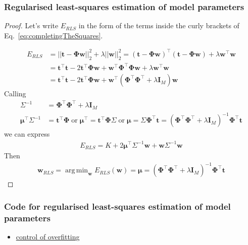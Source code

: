\documentclass[11pt]{beamer}
\DeclareMathOperator*{\argmin}{arg\,min}
\begin{document}
\begin{frame}
    \frametitle{Regularised least-squares estimation of model parameters}
	\tiny
		\begin{proof}
			Let's write $E_{RLS}$ in the form of the terms inside the curly brackets of Eq.~\ref{eq:completingTheSquares}.

		\begin{align*}
			E_{RLS}&=||\mathbf{t}-\boldsymbol{\Phi}\mathbf{w}||_2^2+\lambda||\mathbf{w}||_2^2=(\mathbf{t}-\boldsymbol{\Phi}\mathbf{w})^\intercal(\mathbf{t}-\boldsymbol{\Phi}\mathbf{w})+\lambda\mathbf{w}^\intercal\mathbf{w}\\
                   &=\mathbf{t}^\intercal\mathbf{t}-2\mathbf{t}^\intercal\boldsymbol{\Phi}\mathbf{w}+\mathbf{w}^\intercal\boldsymbol{\Phi}^\intercal\boldsymbol{\Phi}\mathbf{w}+\lambda\mathbf{w}^\intercal\mathbf{w}\\
                   &=\mathbf{t}^\intercal\mathbf{t}-2\mathbf{t}^\intercal\boldsymbol{\Phi}\mathbf{w}+\mathbf{w}^\intercal(\boldsymbol{\Phi}^\intercal\boldsymbol{\Phi}^\intercal+\lambda\mathbf{I}_M)\mathbf{w}
		\end{align*}
		Calling
		\begin{align*}
			\Sigma^{-1}&=\boldsymbol{\Phi}^\intercal\boldsymbol{\Phi}^\intercal+\lambda\mathbf{I}_M\\
			\boldsymbol{\mu}^\intercal\Sigma^{-1}&=\mathbf{t}^\intercal\boldsymbol{\Phi}\;\text{or}\;\boldsymbol{\mu}^\intercal=\mathbf{t}^\intercal\boldsymbol{\Phi}\Sigma\;\text{or}\;\boldsymbol{\mu}=\Sigma\boldsymbol{\Phi}^\intercal\mathbf{t}=\left(\boldsymbol{\Phi}^\intercal\boldsymbol{\Phi}^\intercal+\lambda\mathbf{I}_M\right)^{-1}\boldsymbol{\Phi}^\intercal\mathbf{t}
		\end{align*}
		we can express
		\begin{align*}
			E_{RLS}=K+2\boldsymbol{\mu}^\intercal\Sigma^{-1}\mathbf{w}+\mathbf{w}\Sigma^{-1}\mathbf{w}
		\end{align*}
		Then
		\begin{align*}
			 \mathbf{w}_{RLS}=\argmin_{\mathbf{w}}E_{RLS}(\mathbf{w})=\boldsymbol{\mu}=\left(\boldsymbol{\Phi}^\intercal\boldsymbol{\Phi}^\intercal+\lambda\mathbf{I}_M\right)^{-1}\boldsymbol{\Phi}^\intercal\mathbf{t} 
		\end{align*}
		\end{proof}
	\normalsize
\end{frame}

\begin{frame}
    \frametitle{Code for regularised least-squares estimation of model parameters}
    \begin{itemize}
        \item \href{file:///nfs/ghome/live/rapela/dev/teaching/gcnuBridging2023/repo/docs/sphinx/build/html/auto\_examples/bayesianLinearRegression/plotRegularizedLeastSquares.html\#sphx-glr-auto-examples-bayesianlinearregression-plotregularizedleastsquares-py}{control of overfitting}
    \end{itemize}
\end{frame}
\end{document}
